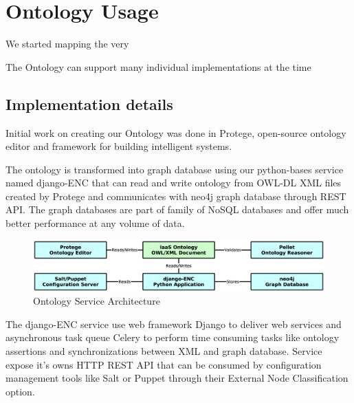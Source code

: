 
\section{Ontology Usage}


We started mapping the very


The Ontology can support many individual implementations at the time

%

\subsection{Implementation details}


Initial work on creating our Ontology was done in Protege, open-source ontology editor and framework for building intelligent systems.

The ontology is transformed into graph database using our python-bases service named django-ENC that can read and write ontology from OWL-DL XML files created by Protege and communicates with neo4j graph database through REST API. The graph databases are part of family of NoSQL databases and offer much better performance at any volume of data.

\begin{figure}[!h]
\centering
\includegraphics[scale=.17]{img/django_enc_arch.eps}
\caption{Ontology Service Architecture}
\label{fig:cm}
\end{figure}

The django-ENC service  use  web framework Django to deliver web services and asynchronous task queue Celery to perform time consuming tasks like ontology assertions and synchronizations between XML and graph database. Service expose it's owns HTTP REST API that can be consumed by configuration management tools like Salt or Puppet through their External Node Classification option.


